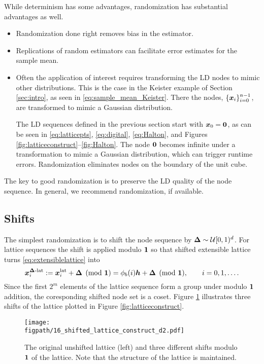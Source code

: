 \documentclass{svproc}
\newcommand{\figpath}{Figures}
\begin{document}
While determinism has some advantages, randomization has substantial advantages as well.
\begin{itemize}
	\item Randomization done right removes bias in the estimator.
	\item Replications of random estimators can facilitate error estimates for the sample mean.
	\item Often the application of interest requires transforming the LD nodes to mimic other distributions.  This is the case in the Keister example of Section \ref{sec:intro}, as seen in \eqref{eq:sample_mean_Keister}.  There the nodes, $\{{\boldsymbol{x}}_i\}_{i=0}^{n-1}$, are transformed to mimic a Gaussian distribution.

	The LD sequences defined in the previous section start with ${\boldsymbol{x}}_0 = {\boldsymbol{0}}$, as can be seen in \eqref{eq:latticepts}, \eqref{eq:digital}, \eqref{eq:Halton}, and Figures \ref{fig:latticeconstruct}--\ref{fig:Halton}.  The node ${\boldsymbol{0}}$ becomes infinite under a transformation to mimic a Gaussian distribution, which can trigger runtime errors.  Randomization eliminates nodes on the boundary of the unit cube.
\end{itemize}
The key to good randomization is to preserve the LD quality of the node sequence.  In general, we recommend randomization, if available.  

\subsection{Shifts} \label{sec:shifts}
The simplest randomization is to shift the node sequence by ${\boldsymbol{\Delta}}  \sim {\mathcal{U}}[0,1)^d$.  For lattice  sequences the shift is applied modulo ${\boldsymbol{1}}$ so that shifted extensible lattice turns
\eqref{eq:extensiblelattice} into
\begin{equation} \label{eq:sh_extensiblelattice}
	{\boldsymbol{x}}^{{\boldsymbol{\Delta}}\text{-lat}}_i := {\boldsymbol{x}}_i^{\text{lat}} + {\boldsymbol{\Delta}} \pmod {{\boldsymbol{1}}} =\phi_b( i){\boldsymbol{h}} + {\boldsymbol{\Delta}} \pmod {{\boldsymbol{1}}}, \qquad i = 0, 1 , \ldots.
\end{equation}
Since the first $2^m$ elements of the lattice sequence form a group under modulo ${\boldsymbol{1}}$ addition, the coresponding shifted node set is a coset.  Figure \ref{fig:shift_lat} illustrates three shifts of the lattice plotted in Figure \ref{fig:latticeconstruct}.

\begin{figure}
	\centering
	\texttt{[image: \\figpath/16\_shifted\_lattice\_construct\_d2.pdf]}
	\caption{The original unshifted lattice (left) and three different shifts modulo ${\boldsymbol{1}}$ of the lattice.  Note that the structure of the lattice is maintained. \label{fig:shift_lat}}
\end{figure}
\end{document}
